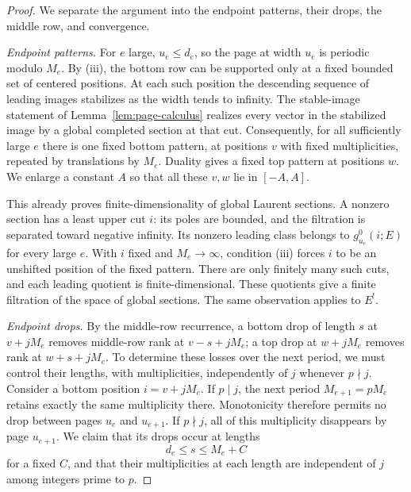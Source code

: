 \begin{proof}
We separate the argument into the endpoint patterns, their drops,
the middle row, and convergence.

\medskip\noindent
\emph{Endpoint patterns.}
For $e$ large, $u_e\le d_e$, so the page at width $u_e$ is periodic
modulo $M_e$.  By (iii), the bottom row can be supported only at a
fixed bounded set of centered positions.  At each such position the
descending sequence of leading images stabilizes as the width tends
to infinity.  The stable-image statement of
Lemma~\ref{lem:page-calculus} realizes every vector in the stabilized
image by a global completed section at that cut.
Consequently, for all sufficiently large $e$ there is one fixed
bottom pattern, at positions $v$ with fixed multiplicities, repeated
by translations by $M_e$.  Duality gives a fixed top pattern at
positions $w$.  We enlarge a constant $A$ so that all these $v,w$
lie in $[-A,A]$.

This already proves finite-dimensionality of global Laurent
sections.  A nonzero section has a least upper cut $i$: its poles
are bounded, and the filtration is separated toward negative
infinity.  Its nonzero leading class belongs to $g^0_{u_e}(i;E)$
for every large $e$.  With $i$ fixed and $M_e\to\infty$, condition
(iii) forces $i$ to be an unshifted position of the fixed pattern.
There are only finitely many such cuts, and each leading quotient
is finite-dimensional.  These quotients give a finite filtration of
the space of global sections.  The same observation applies to $E^!$.

\medskip\noindent
\emph{Endpoint drops.}
By the middle-row recurrence, a bottom drop of length $s$ at
$v+jM_e$ removes middle-row rank at $v-s+jM_e$; a top drop at
$w+jM_e$ removes rank at $w+s+jM_e$.  To determine these losses
over the next period, we must control their lengths, with
multiplicities, independently of $j$ whenever $p\nmid j$.
Consider a bottom position $i=v+jM_e$.  If $p\mid j$, the next
period $M_{e+1}=pM_e$ retains exactly the same multiplicity there.
Monotonicity therefore permits no drop between pages $u_e$ and
$u_{e+1}$.  If $p\nmid j$, all of this multiplicity disappears
by page $u_{e+1}$.  We claim that its drops occur at lengths
\begin{equation}\label{eq:drop-range}
 d_e\le s\le M_e+C
\end{equation}
for a fixed $C$, and that their multiplicities at each length are
independent of $j$ among integers prime to $p$.


\end{proof}
